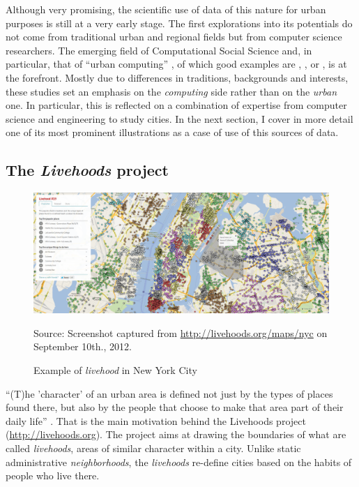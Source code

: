 \documentclass[12pt]{article}
\begin{document}
Although very promising, the scientific use of data of this nature for urban
purposes is still at a very early stage. The first
explorations into its potentials do not come from traditional urban and regional
fields but from computer science researchers. The emerging field of
Computational Social Science \citep{compSocSci2009science} and, in particular,
that of ``urban computing'' \citep{cranshaw2012livehoods}, of
which good examples are \cite{calabrese2011connected}, \cite{Cranshaw:2010:BGP:1864349.1864380},
\cite{cheng2011checkins} or \cite{noulas2011}, is at the forefront. 
%
Mostly due to differences in traditions, backgrounds and interests, these
studies set an emphasis on the \emph{computing} side rather than on the \emph{urban} one. In
particular, this is reflected on a combination of expertise from computer
science and engineering to study cities.
%
In the next section, I cover in more detail one of its most prominent
illustrations as a case of use of this sources of data.

\subsection{The \emph{Livehoods} project}

\begin{figure}[<+t+>]
   \begin{center}
       \includegraphics[width=1.0\textwidth]{livehoods.png}
   \end{center}
   \begin{footnotesize}
       Source: Screenshot captured from
       \url{http://livehoods.org/maps/nyc} on September 10th., 2012.
   \end{footnotesize}
   \caption{Example of \textit{livehood} in New York City}
   \label{fig:livehood}
\end{figure}
``(T)he 'character' of an urban area is defined not just by the types of
places found there, but also by the people that choose to make that area part
of their daily life'' \citep{cranshaw2012livehoods}. That is the main
motivation behind the Livehoods project
(\url{http://livehoods.org}).
%
The project aims at drawing the boundaries of what are called
\textit{livehoods}, areas of similar character within a city. Unlike static
administrative \textit{neighborhoods}, the \textit{livehoods}
re-define cities based on the habits of people who live there.
\end{document}
